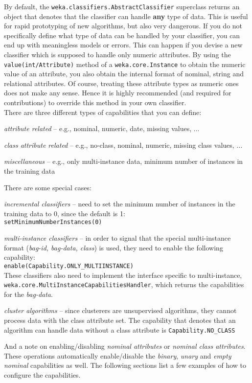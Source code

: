\newpage
{}
\label{classifier_capabilities}
By default, the \texttt{weka.classifiers.AbstractClassifier} superclass returns
an object that denotes that the classifier can handle \textbf{any} type of data.
This is useful for rapid prototyping of new algorithms, but also very
dangerous. If you do not specifically define what type of data can be handled by
your classifier, you can end up with meaningless models or errors. This can
happen if you devise a new classifier which is supposed to handle only numeric
attributes. By using the \texttt{value(int/Attribute)} method of a
\texttt{weka.core.Instance} to obtain the numeric value of an attribute, you
also obtain the internal format of nominal, string and relational attributes. Of
course, treating these attribute types as numeric ones does not make any sense.
Hence it is highly recommended (and required for contributions) to override this
method in your own classifier. \\

\noindent There are three different types of capabilities that you can define:
\begin{tight_enumerate}
  \item \textit{attribute related} -- e.g., nominal, numeric, date, missing
values, ...
  \item \textit{class attribute related} -- e.g., no-class, nominal, numeric,
missing class values, ...
  \item \textit{miscellaneous} -- e.g., only multi-instance data, minimum number
of instances in the training data
\end{tight_enumerate}
There are some special cases:
\begin{tight_itemize}
  \item \textit{incremental classifiers} -- need to set the minimum number of
instances in the training data to 0, since the default is 1: \\
  \texttt{setMinimumNumberInstances(0)}
  
  \item \textit{multi-instance classifiers} -- in order to signal that the
special multi-instance format (\textit{bag-id, bag-data, class}) is used, they
need to enable the following capability: \\
  \texttt{enable(Capability.ONLY\_MULTIINSTANCE)} \\
  These classifiers also need to implement the interface specific to
multi-instance, \texttt{weka.core.MultiInstanceCapabilitiesHandler}, which
returns the capabilities for the \textit{bag-data}.

  \item \textit{cluster algorithms} -- since clusterers are unsupervised
algorithms, they cannot process data with the class attribute set. The
capability that denotes that an algorithm can handle data without a class
attribute is \texttt{Capability.NO\_CLASS}
\end{tight_itemize}
And a note on enabling/disabling \textit{nominal attributes} or \textit{nominal
class attributes}. These operations automatically enable/disable the
\textit{binary}, \textit{unary} and \textit{empty nominal} capabilities as well.
The following sections list a few examples of how to configure the capabilities.


